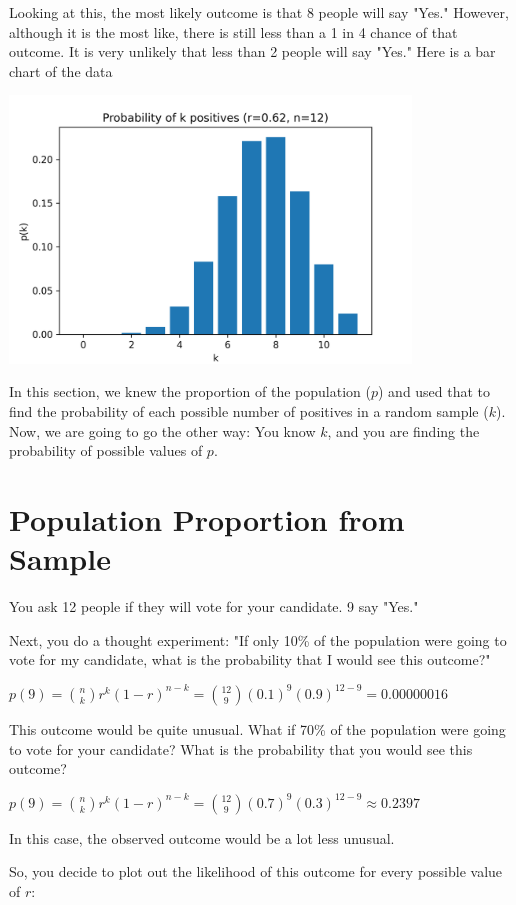 Looking at this,  the most likely outcome is that 8 people will say "Yes."  However, although it is the most like,  there is still less than a 1 in 4 chance of that outcome. It is very unlikely that less than 2 people will say "Yes."  
Here is a bar chart of the data

\includegraphics[width=0.8\textwidth]{binomial_dist.png}

In this section,  we knew the proportion of the population ($p$) and used that to find the probability of each possible number of positives in a random sample ($k$).  
Now, we are going to go the other way:  You know $k$, and you are finding the probability of possible values of $p$.


\section{Population Proportion from Sample}

You ask 12 people if they will vote for your candidate.  9 say "Yes."

Next, you do a thought experiment:  "If only 10\% of the population were going to vote for my candidate,  what is the probability that I would see this outcome?"

$p(9) =  \binom{n}{k}r^k(1-r)^{n-k} =  \binom{12}{9}(0.1)^9 (0.9)^{12-9} = 0.00000016$

This outcome would be quite unusual. What if 70\% of the population were going to vote for your candidate?  What is the probability that you would see this outcome?

$p(9) =  \binom{n}{k}r^k(1-r)^{n-k} =  \binom{12}{9}(0.7)^9 (0.3)^{12-9} \approx 0.2397$

In this case, the observed outcome would be a lot less unusual.

So, you decide to plot out the likelihood of this outcome for every possible value of $r$:

